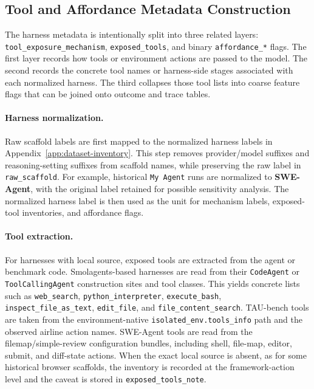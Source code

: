 \subsection{Tool and Affordance Metadata Construction}

The harness metadata is intentionally split into three related layers:
\texttt{tool\_exposure\_mechanism}, \texttt{exposed\_tools}, and binary
\texttt{affordance\_*} flags. The first layer records how tools or
environment actions are passed to the model. The second records the concrete
tool names or harness-side stages associated with each normalized harness. The
third collapses those tool lists into coarse feature flags that can be joined
onto outcome and trace tables.

\paragraph{Harness normalization.}
Raw scaffold labels are first mapped to the normalized harness labels in
Appendix~\ref{app:dataset-inventory}. This step removes provider/model suffixes
and reasoning-setting suffixes from scaffold names, while preserving the raw
label in \texttt{raw\_scaffold}. For example, historical \texttt{My Agent}
runs are normalized to \textbf{SWE-Agent}, with the original label retained for
possible sensitivity analysis. The normalized harness label is then used as the
unit for mechanism labels, exposed-tool inventories, and affordance flags.

\paragraph{Tool extraction.}
For harnesses with local source, exposed tools are extracted from the agent or
benchmark code. Smolagents-based harnesses are read from their
\texttt{CodeAgent} or \texttt{ToolCallingAgent} construction sites and tool
classes. This yields concrete lists such as \texttt{web\_search},
\texttt{python\_interpreter}, \texttt{execute\_bash},
\texttt{inspect\_file\_as\_text}, \texttt{edit\_file}, and
\texttt{file\_content\_search}. TAU-bench tools are taken from the
environment-native \texttt{isolated\_env.tools\_info} path and the observed
airline action names. SWE-Agent tools are read from the filemap/simple-review
configuration bundles, including shell, file-map, editor, submit, and
diff-state actions. When the exact local source is absent, as for some
historical browser scaffolds, the inventory is recorded at the framework-action
level and the caveat is stored in \texttt{exposed\_tools\_note}.

